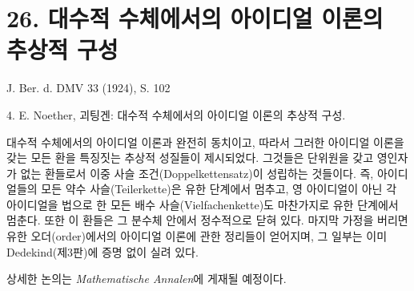 \documentclass[11pt]{article}
\begin{document}
\section*{26. 대수적 수체에서의 아이디얼 이론의 추상적 구성}

\begin{center}
J. Ber. d. DMV 33 (1924), S. 102
\end{center}

4. E. Noether, 괴팅겐: 대수적 수체에서의 아이디얼 이론의 추상적 구성.

대수적 수체에서의 아이디얼 이론과 완전히 동치이고, 따라서 그러한 아이디얼 이론을 갖는 모든 환을 특징짓는 추상적 성질들이 제시되었다. 그것들은 단위원을 갖고 영인자가 없는 환들로서 이중 사슬 조건(Doppelkettensatz)이 성립하는 것들이다. 즉, 아이디얼들의 모든 약수 사슬(Teilerkette)은 유한 단계에서 멈추고, 영 아이디얼이 아닌 각 아이디얼을 법으로 한 모든 배수 사슬(Vielfachenkette)도 마찬가지로 유한 단계에서 멈춘다. 또한 이 환들은 그 분수체 안에서 정수적으로 닫혀 있다. 마지막 가정을 버리면 유한 오더(order)에서의 아이디얼 이론에 관한 정리들이 얻어지며, 그 일부는 이미 Dedekind(제3판)에 증명 없이 실려 있다.

상세한 논의는 \emph{Mathematische Annalen}에 게재될 예정이다.
\end{document}
